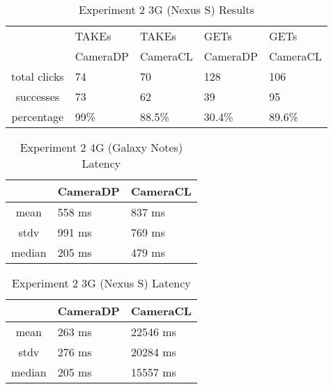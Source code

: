 \begin{table}[htb]
\begin{scriptsize} 
\caption{Experiment 2 3G (Nexus S) Results} 
\label{table:exp-2-3g-results}
 \begin{center}
 \begin{tabular}{| c | p{1.5cm} | p{1.5cm} | p{1.5cm} | p{1.4cm} |}
  \hline
  & TAKEs & TAKEs & GETs & GETs \\
  & CameraDP & CameraCL & CameraDP & CameraCL \\
  \hline
  total clicks & 74 & 70 & 128 & 106 \\
  \hline
  successes & 73 & 62 & 39 & 95 \\
  \hline
  percentage & 99\% & 88.5\% & 30.4\% & 89.6\% \\
  \hline
  \end{tabular}
  \end{center}
\end{scriptsize}
\end{table}


\begin{table}[htb]
\begin{scriptsize} 
\caption{Experiment 2 4G (Galaxy Notes) Latency} 
\label{table:exp-2-4g-latency-results}
 \begin{center}
 \begin{tabular}{| c | p{1.5cm} | p{1.5cm} |}
  \hline
  & CameraDP & CameraCL \\
  \hline
  mean & 558 ms & 837 ms\\
  \hline
  stdv & 991 ms & 769 ms \\
  \hline
  median & 205 ms & 479 ms\\
  \hline
  \end{tabular}
  \end{center}
\end{scriptsize}
\end{table}

\begin{table}[htb]
\begin{scriptsize} 
\caption{Experiment 2 3G (Nexus S) Latency} 
\label{table:exp-2-3g-latency-results}
 \begin{center}
 \begin{tabular}{| c | p{1.5cm} | p{1.5cm} |}
  \hline
  & CameraDP & CameraCL \\
  \hline
  mean & 263 ms & 22546 ms \\
  \hline
  stdv & 276 ms & 20284 ms\\
  \hline
  median & 205 ms & 15557 ms\\
  \hline
  \end{tabular}
  \end{center}
\end{scriptsize}
\end{table}

